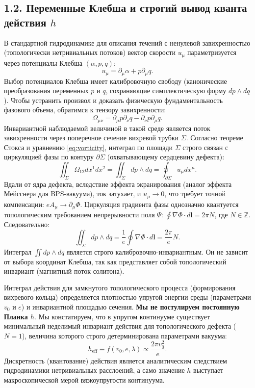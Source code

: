\documentclass[12pt,a4paper]{article}
\begin{document}
	\subsection{1.2. Переменные Клебша и строгий вывод кванта действия $h$}
	В стандартной гидродинамике для описания течений с ненулевой завихренностью (топологически нетривиальных потоков) вектор скорости $u_\mu$ параметризуется через потенциалы Клебша $(\alpha, p, q)$:
	\begin{equation}
		u_\mu = \partial_\mu \alpha + p \partial_\mu q.
	\end{equation}
	Выбор потенциалов Клебша имеет калибровочную свободу (канонические преобразования переменных $p$ и $q$, сохраняющие симплектическую форму $dp \wedge dq$). Чтобы устранить произвол и доказать физическую фундаментальность фазового объема, обратимся к тензору завихренности:
	\begin{equation}
		\Omega_{\mu\nu} = \partial_\mu p \partial_\nu q - \partial_\nu p \partial_\mu q.
	\end{equation}
	Инвариантной наблюдаемой величиной в такой среде является поток завихренности через поперечное сечение вихревой трубки $\Sigma$. Согласно теореме Стокса и уравнению \eqref{eq:vorticity}, интеграл по площади $\Sigma$ строго связан с циркуляцией фазы по контуру $\partial \Sigma$ (охватывающему сердцевину дефекта):
	\begin{equation}
		\iint_\Sigma \Omega_{12} dx^1 dx^2 = \iint_\Sigma dp \wedge dq = \oint_{\partial \Sigma} u_\mu dx^\mu.
	\end{equation}
	Вдали от ядра дефекта, вследствие эффекта экранирования (аналог эффекта Мейсснера для BPS-вакуума), ток затухает, и $u_\mu \to 0$, что требует точной компенсации: $e A_\mu \to \partial_\mu \Phi$. Циркуляция градиента фазы однозначно квантуется топологическим требованием непрерывности поля $\Psi$: $\oint \nabla \Phi \cdot d\mathbf{l} = 2\pi N$, где $N \in \mathbb{Z}$. Следовательно:
	\begin{equation}
		\iint_\Sigma dp \wedge dq = \frac{1}{e} \oint \nabla \Phi \cdot d\mathbf{l} = \frac{2\pi}{e} N.
		\label{eq:flux_quantization}
	\end{equation}
	Интеграл $\iint dp \wedge dq$ является строго калибровочно-инвариантным. Он не зависит от выбора координат Клебша, так как представляет собой топологический инвариант (магнитный поток солитона). 
	
	Интеграл действия для замкнутого топологического процесса (формирования вихревого кольца) определяется плотностью упругой энергии среды (параметрами $v_0$ и $e$) и инвариантной площадью сечения. \textbf{Мы не постулируем постоянную Планка $h$}. Мы констатируем, что в упругом континууме существует минимальный неделимый инвариант действия для топологического дефекта ($N=1$), величина которого строго детерминирована параметрами вакуума:
	\begin{equation}
		h_{\text{eff}} \equiv f(v_0, e, \lambda) \propto \frac{2\pi v_0^2}{e}.
	\end{equation}
	Дискретность (квантование) действия является аналитическим следствием гидродинамики нетривиальных расслоений, а само значение $h$ выступает макроскопической мерой вязкоупругости континуума.
	
\end{document}
